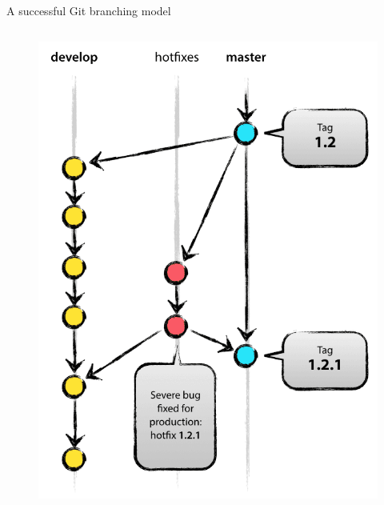 \documentclass[10pt, aspectratio=169, xcolor=dvipsnames]{beamer}
\begin{document}
\begin{frame}[t]{A successful Git branching model}
\begin{columns}
        \begin{column}[t]{0.25\textwidth}
            \begin{figure}
                \includegraphics[width = \textwidth]{hotfixbr.png}
            \end{figure}
        \end{column}
    \end{columns}
\end{frame}
\end{document}
